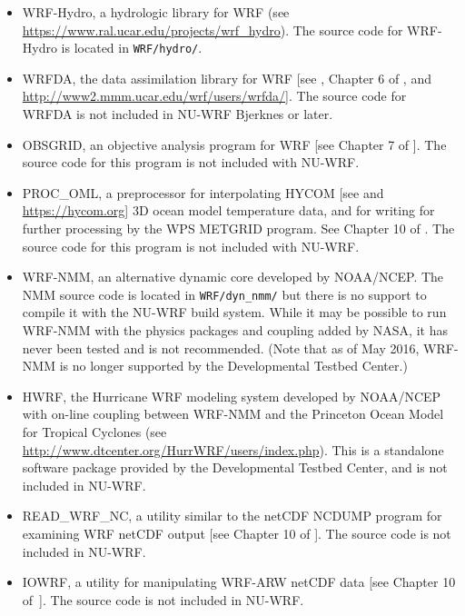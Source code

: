 \begin{itemize}
\item WRF-Hydro, a hydrologic library for WRF (see 
\url{https://www.ral.ucar.edu/projects/wrf_hydro}). The source code for 
WRF-Hydro is located in \texttt{WRF/hydro/}.  

\item WRFDA, the data assimilation library for WRF [see 
\cite{ref:BarkerEtAl2012}, Chapter 6 of \cite{ref:ArwUserGuide}, and
\url{http://www2.mmm.ucar.edu/wrf/users/wrfda/}]. The source code for WRFDA is
not included in NU-WRF Bjerknes or later.

\item OBSGRID, an objective analysis program for WRF [see Chapter 7 of 
\cite{ref:ArwUserGuide}]. The source code for this program is not included
with NU-WRF.

\item PROC\_OML, a preprocessor for interpolating HYCOM
[see \cite{ref:HycomUserGuide} and \url{https://hycom.org}] 3D ocean model 
temperature data, and for writing for further processing by the WPS METGRID 
program. See Chapter 10 of \cite{ref:ArwUserGuide}. The source code for this 
program is not included with NU-WRF.

\item WRF-NMM, an alternative dynamic core developed by NOAA/NCEP. The NMM 
source code is located in \texttt{WRF/dyn\_nmm/} but there is no support to 
compile it with the NU-WRF build system. While it may be possible to run 
WRF-NMM with the physics packages and coupling added by NASA, it has never 
been tested and is not recommended.  (Note that as of May 2016, WRF-NMM is no 
longer supported by the Developmental Testbed Center.)

\item HWRF, the Hurricane WRF modeling system developed by NOAA/NCEP with 
on-line coupling between WRF-NMM and the Princeton Ocean Model for Tropical 
Cyclones (see \url{http://www.dtcenter.org/HurrWRF/users/index.php}). This is 
a standalone software package provided by the Developmental Testbed Center, 
and is not included in NU-WRF.

\item READ\_WRF\_NC, a utility similar to the netCDF NCDUMP program
for examining WRF netCDF output [see Chapter 10 of \cite{ref:ArwUserGuide}]. 
The source code is not included in NU-WRF.

\item IOWRF, a utility for manipulating WRF-ARW netCDF data [see Chapter 10 
of~\cite{ref:ArwUserGuide}]. The source code is not included in NU-WRF.


\end{itemize}
